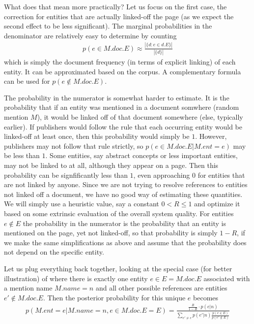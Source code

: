 \documentclass{article}
\begin{document}
What does that mean more practically? Let us focus on the first case, the correction for entities that are actually linked-off the page (as we expect the second effect to be less significant). The marginal probabilities in the denominator are relatively easy to determine by counting
\begin{align}
p(e \in M.doc.E) \approx \frac{|\{d: e \in d.E\}|}{|\{d\}|}
\end{align}
which is simply the document frequency (in terms of explicit linking) of each entity. It can be approximated based on the corpus. A complementary formula can be used for $p(e \not\in M.doc.E)$. 

The probability in the numerator is somewhat harder to estimate. It is the probability that if an entity was mentioned in a document somwhere (random mention $M$), it would be linked off of that document somewhere (else, typically earlier). If publishers would follow the rule that each occurring entity would be linked-off at least once, then this probability would simply be $1$. However, publishers may not follow that rule strictly, so $p(e \in M.doc.E | M.ent=e)$ may be less than $1$. Some entities, say abstract concepts or less important entities, may not be linked to at all, although they appear on a page. Then this probability can be signfificantly less than $1$, even approaching $0$ for entities that are not linked by anyone. Since we are not trying to resolve references to entities not linked off a document, we have no good way of estimating these quantities. We will simply use a heuristic value, say a constant $0 < R \leq 1$ and optimize it based on some extrinsic evaluation of the overall system quality. For entities $e \not\in E$ the probability in the numerator is the probability that an entity is mentioned on the page, yet not linked-off, so that probability is simply $1-R$, if we make the same simplifications as above and assume that the probability does not depend on the specific entity.   
 
Let us plug everything back together, looking at the special case (for better illustration) of where there is exactly one entity $e \in E = M.doc.E$ associated with a mention name $M.name=n$ and all other possible references are entities $e' \not\in M.doc.E$. Then the posterior probability for this unique $e$ becomes
\begin{align}
p(M.ent=e | M.name=n, e\in M.doc.E=E) =  \frac{\frac R{1-R} \cdot p(e|n)}{\sum_{e' \neq e} p(e'|n) \frac{p(e \in E)}{p(e' \not\in E)}}
\label{eq:posterior-approx}
\end{align}
\end{document}
